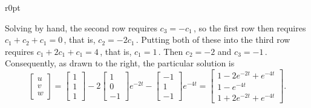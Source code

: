 \begin{example}
\begin{solution}
\begin{wrapfigure}r{0pt}
\end{wrapfigure}
Solving by hand, the second row requires \(c_3=-c_1\)\,, so the first row then requires \(c_1+c_2+c_1=0\)\,, that is, \(c_2=-2c_1\)\,.
Putting both of these into the third row requires \(c_1+2c_1+c_1=4\)\,, that is, \(c_1=1\)\,.
Then \(c_2=-2\) and \(c_3=-1\)\,.
Consequently, as drawn to the right, the particular solution is 
\begin{equation*}
\begin{bmatrix} u\\v\\w \end{bmatrix}
=\begin{bmatrix} 1\\1\\1 \end{bmatrix}
-2\begin{bmatrix} 1\\0\\-1 \end{bmatrix}e^{-2t}
-\begin{bmatrix} -1\\1\\-1 \end{bmatrix}e^{-4t}
=\begin{bmatrix} 1-2e^{-2t}+e^{-4t}\\1-e^{-4t}\\1+2e^{-2t}+e^{-4t} \end{bmatrix}.
\end{equation*}
\end{solution}
\end{example}





